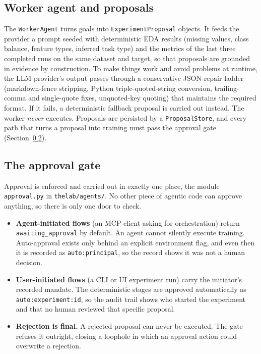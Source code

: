 \subsection{Worker agent and proposals}

The \texttt{WorkerAgent} turns goals into \texttt{ExperimentProposal} objects. It feeds the provider a prompt seeded with deterministic EDA results (missing values, class balance, feature types, inferred task type) and the metrics of the last three completed runs on the same dataset and target, so that proposals are grounded in evidence by construction. To make things work and avoid problems at runtime, the LLM provider's output passes through a conservative JSON-repair ladder (markdown-fence stripping, Python triple-quoted-string conversion, trailing-comma and single-quote fixes, unquoted-key quoting) that maintains the required format. If it fails, a deterministic fallback proposal is carried out instead. The worker \emph{never} executes. Proposals are persisted by a \texttt{ProposalStore}, and every path that turns a proposal into training must pass the approval gate (Section~\ref{sec:approvalgate}).

\subsection{The approval gate}
\label{sec:approvalgate}

Approval is enforced and carried out in exactly one place, the module \texttt{approval.py} in \texttt{thelab/agents/}. No other piece of agentic code can approve anything, so there is only one door to check.

\begin{itemize}
	\item \textbf{Agent-initiated flows} (an MCP client asking for orchestration) return \texttt{awaiting\_approval} by default. An agent cannot silently execute training. Auto-approval exists only behind an explicit environment flag, and even then it is recorded as \texttt{auto:\textlangle principal\textrangle}, so the record shows it was not a human decision.
	\item \textbf{User-initiated flows} (a CLI or UI experiment run) carry the initiator's recorded mandate. The deterministic stages are approved automatically as \texttt{auto:}\allowbreak{}\texttt{experiment:}\allowbreak{}\texttt{\textlangle id\textrangle}, so the audit trail shows who started the experiment and that no human reviewed that specific proposal.
	\item \textbf{Rejection is final.} A rejected proposal can never be executed. The gate refuses it outright, closing a loophole in which an approval action could overwrite a rejection.
\end{itemize}


